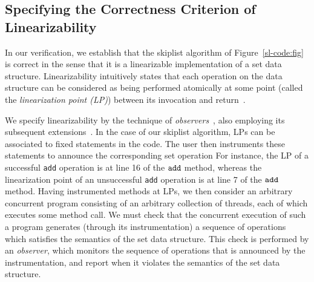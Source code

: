 \subsection{Specifying the Correctness Criterion of Linearizability}
In our verification, we establish that the skiplist algorithm of
Figure~\ref{sl-code:fig} is correct in the sense that it is a
linearizable implementation of a set data structure.
Linearizability intuitively states that
each operation on the data structure can be considered as being
performed atomically at some point (called the {\em linearization point (LP)})
between its invocation and return~\cite{HeWi:linearizability}.

We specify linearizability by the technique of
{\em observers}~\cite{AHHR:integrated}, also employing its subsequent
extensions~\cite{BEEH:icalp15,HSV:concur13,Quy:sas16}.
In the case of our skiplist algorithm,
LPs can be associated to fixed statements in the code. The user then instruments
these statements to announce the corresponding set operation
For instance, the LP of a successful {\tt add} operation is at line 16 of the $\tt add$ method, whereas the linearization point of an unsuccessful {\tt add} operation is at line 7 of the $\tt add$ method.  %
Having instrumented methods at LPs, we
then consider an arbitrary concurrent program consisting of
an arbitrary collection of threads, each of which executes some method call.
We must check that the concurrent execution of such a program generates
(through its instrumentation) a sequence of operations which satisfies the
semantics of the set data structure. 
This check is performed by an {\em observer}, which 
monitors the sequence of operations that is announced by the
instrumentation, and report when it violates the semantics of the set
data structure.



